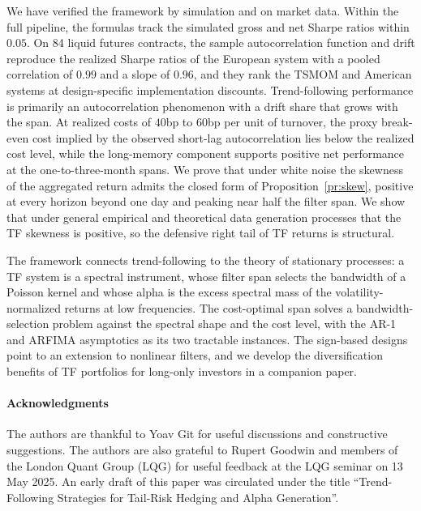 \documentclass[hidelinks]{siamonline250211}
\begin{document}
We have verified the framework by simulation and on market data. Within the full pipeline, the formulas track the simulated gross and net Sharpe ratios within $0.05$. On 84 liquid futures contracts, the sample autocorrelation function and drift reproduce the realized Sharpe ratios of the European system with a pooled correlation of $0.99$ and a slope of $0.96$, and they rank the TSMOM and American systems at design-specific implementation discounts. Trend-following performance is primarily an autocorrelation phenomenon with a drift share that grows with the span. At realized costs of $40$bp to $60$bp per unit of turnover, the proxy break-even cost implied by the observed short-lag autocorrelation lies below the realized cost level, while the long-memory component supports positive net performance at the one-to-three-month spans. We prove that under white noise the skewness of the aggregated return admits the closed form of Proposition~\ref{pr:skew}, positive at every horizon beyond one day and peaking near half the filter span. We show that under general empirical and theoretical data generation processes that the TF skewness is positive, so the defensive right tail of TF returns is structural.

The framework connects trend-following to the theory of stationary processes: a TF system is a spectral instrument, whose filter span selects the bandwidth of a Poisson kernel and whose alpha is the excess spectral mass of the volatility-normalized returns at low frequencies. The cost-optimal span solves a bandwidth-selection problem against the spectral shape and the cost level, with the AR-1 and ARFIMA asymptotics as its two tractable instances. The sign-based designs point to an extension to nonlinear filters, and we develop the diversification benefits of TF portfolios for long-only investors in a companion paper.



\paragraph{Acknowledgments}

The authors are thankful to Yoav Git for useful discussions and constructive suggestions. The authors are also grateful to Rupert Goodwin and members of the London Quant Group (LQG) for useful feedback at the LQG seminar on 13 May 2025. An early draft of this paper was circulated under the title ``Trend-Following Strategies for Tail-Risk Hedging and Alpha Generation''.
\end{document}
